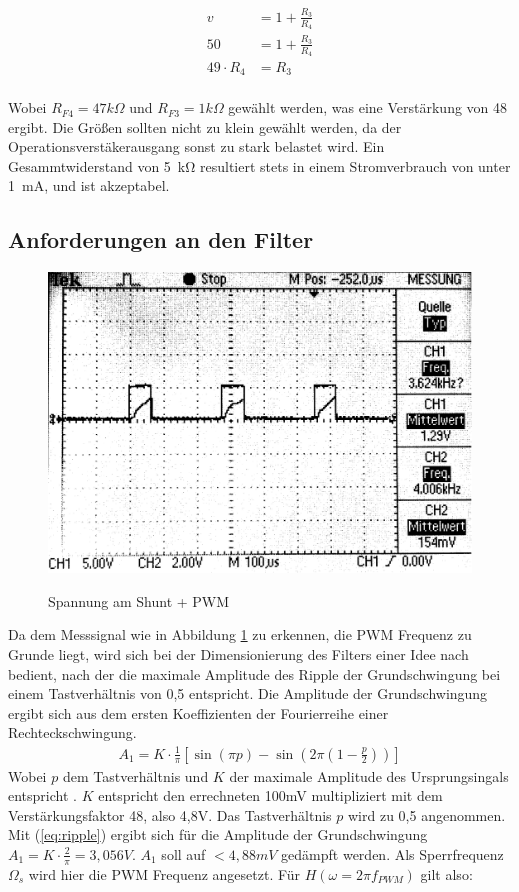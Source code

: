 \begin{align*}
v &= 1 + \frac{R_{3}}{R_{4}}\\
50 &= 1 + \frac{R_{3}}{R_{4}}\\
49\cdot R_{4} &= R_{3}
\end{align*}
\\
Wobei $R_{F4} = 47 k\Omega$ und $R_{F3} = 1 k\Omega$  gewählt werden, was eine Verstärkung von 48 ergibt. Die Größen sollten nicht zu klein gewählt werden, 
da der Operationsverstäkerausgang sonst zu stark belastet wird. Ein Gesammtwiderstand von \SI{5}{\kohm} resultiert stets in einem Stromverbrauch von unter \SI{1}{\mA}, und ist
akzeptabel.


\subsection{Anforderungen an den Filter}

\begin{figure}[H]
\centering
\includegraphics[width=.8\textwidth]{oszi.png}\\
\caption{Spannung am Shunt + PWM}%
\label{fig:pwm+i}
\end{figure}

Da dem Messsignal wie in Abbildung \ref{fig:pwm+i} zu erkennen, die PWM Frequenz zu Grunde liegt, wird sich bei der Dimensionierung des Filters einer Idee nach \cite{Alter2008} bedient, nach der die maximale Amplitude des Ripple der Grundschwingung bei einem
Tastverhältnis von 0,5 entspricht. Die Amplitude der Grundschwingung ergibt sich aus dem ersten Koeffizienten der Fourierreihe einer Rechteckschwingung.
\begin{align}
A_1 = K\cdot \frac{1}{\pi}[\sin(\pi p)-\sin(2\pi(1-\frac{p}{2}))]
\label{eq:ripple}
\end{align}
Wobei $p$ dem Tastverhältnis und $K$ der maximale Amplitude des Ursprungsingals entspricht \cite{Alter2008}. $K$ entspricht den errechneten 100mV multipliziert mit dem Verstärkungsfaktor 48, also 4,8V. Das Tastverhältnis $p$ wird zu 0,5
angenommen. Mit (\ref{eq:ripple}) ergibt sich für die Amplitude der Grundschwingung $ A_1 = K\cdot \frac{2}{\pi} = 3,056V$. $A_1$ soll auf $ < 4,88mV$ gedämpft werden.
Als Sperrfrequenz $\Omega_s $ wird hier die PWM Frequenz angesetzt. Für $H(\omega=2\pi f_{PWM})$ gilt also:

